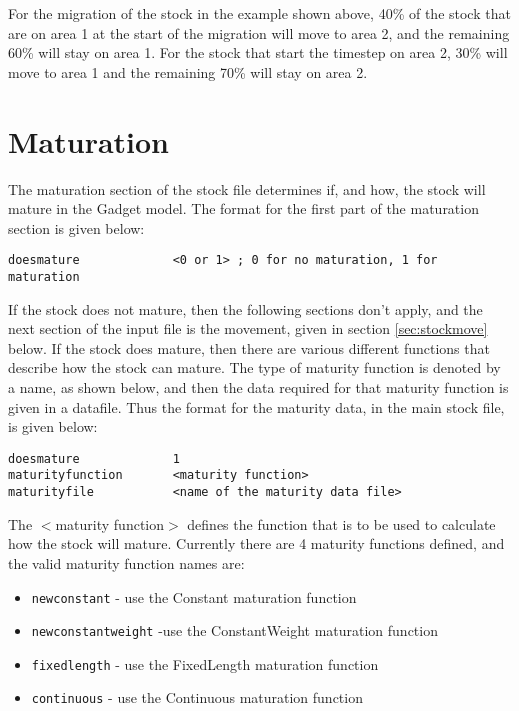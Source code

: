 \documentclass[]{book}
\providecommand{\tightlist}{%
  \setlength{\itemsep}{0pt}\setlength{\parskip}{0pt}}
\begin{document}
For the migration of the stock in the example shown above, 40\% of the
stock that are on area 1 at the start of the migration will move to area
2, and the remaining 60\% will stay on area 1. For the stock that start
the timestep on area 2, 30\% will move to area 1 and the remaining 70\%
will stay on area 2.

\hypertarget{sec:stockmature}{%
\section{Maturation}\label{sec:stockmature}}

The maturation section of the stock file determines if, and how, the
stock will mature in the Gadget model. The format for the first part of
the maturation section is given below:

\begin{verbatim}
doesmature             <0 or 1> ; 0 for no maturation, 1 for maturation
\end{verbatim}

If the stock does not mature, then the following sections don't apply,
and the next section of the input file is the movement, given in
section \ref{sec:stockmove} below. If the stock does mature, then there
are various different functions that describe how the stock can mature.
The type of maturity function is denoted by a name, as shown below, and
then the data required for that maturity function is given in a
datafile. Thus the format for the maturity data, in the main stock file,
is given below:

\begin{verbatim}
doesmature             1
maturityfunction       <maturity function>
maturityfile           <name of the maturity data file>
\end{verbatim}

The \(<\)maturity function\(>\) defines the function that is to be used to
calculate how the stock will mature. Currently there are 4 maturity
functions defined, and the valid maturity function names are:

\begin{itemize}
\tightlist
\item
  \texttt{newconstant} - use the Constant maturation function
\item
  \texttt{newconstantweight} -use the ConstantWeight maturation function
\item
  \texttt{fixedlength} - use the FixedLength maturation function
\item
  \texttt{continuous} - use the Continuous maturation function
\end{itemize}
\end{document}
